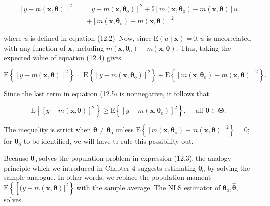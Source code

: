 \documentclass[10pt]{article}
\begin{document}
\begin{align*}
{[y-m(\mathbf{x}, \boldsymbol{\theta})]^{2}=} & {\left[y-m\left(\mathbf{x}, \boldsymbol{\theta}_{\mathrm{o}}\right)\right]^{2}+2\left[m\left(\mathbf{x}, \boldsymbol{\theta}_{\mathrm{o}}\right)-m(\mathbf{x}, \boldsymbol{\theta})\right] u } \\
& +\left[m\left(\mathbf{x}, \boldsymbol{\theta}_{\mathrm{o}}\right)-m(\mathbf{x}, \boldsymbol{\theta})\right]^{2} \tag{12.4}
\end{align*}


where $u$ is defined in equation (12.2). Now, since $\mathrm{E}(u \mid \mathbf{x})=0, u$ is uncorrelated with any function of $\mathbf{x}$, including $m\left(\mathbf{x}, \boldsymbol{\theta}_{\mathrm{o}}\right)-m(\mathbf{x}, \boldsymbol{\theta})$. Thus, taking the expected value of equation (12.4) gives


\begin{equation*}
\mathrm{E}\left\{[y-m(\mathbf{x}, \boldsymbol{\theta})]^{2}\right\}=\mathrm{E}\left\{\left[y-m\left(\mathbf{x}, \boldsymbol{\theta}_{\mathrm{o}}\right)\right]^{2}\right\}+\mathrm{E}\left\{\left[m\left(\mathbf{x}, \boldsymbol{\theta}_{\mathrm{o}}\right)-m(\mathbf{x}, \boldsymbol{\theta})\right]^{2}\right\} . \tag{12.5}
\end{equation*}


Since the last term in equation (12.5) is nonnegative, it follows that


\begin{equation*}
\mathrm{E}\left\{[y-m(\mathbf{x}, \boldsymbol{\theta})]^{2}\right\} \geq \mathrm{E}\left\{\left[y-m\left(\mathbf{x}, \boldsymbol{\theta}_{\mathrm{o}}\right)\right]^{2}\right\}, \quad \text { all } \boldsymbol{\theta} \in \boldsymbol{\Theta} . \tag{12.6}
\end{equation*}


The inequality is strict when $\boldsymbol{\theta} \neq \boldsymbol{\theta}_{\mathrm{o}}$ unless $\mathrm{E}\left\{\left[m\left(\mathbf{x}, \boldsymbol{\theta}_{\mathrm{o}}\right)-m(\mathbf{x}, \boldsymbol{\theta})\right]^{2}\right\}=0$; for $\boldsymbol{\theta}_{\mathrm{o}}$ to be identified, we will have to rule this possibility out.

Because $\boldsymbol{\theta}_{\mathrm{o}}$ solves the population problem in expression (12.3), the analogy principle-which we introduced in Chapter 4-suggests estimating $\boldsymbol{\theta}_{\mathrm{o}}$ by solving the sample analogue. In other words, we replace the population moment $\mathrm{E}\left\{\left[(y-m(\mathbf{x}, \boldsymbol{\theta})]^{2}\right\}\right.$ with the sample average. The NLS estimator of $\boldsymbol{\theta}_{\mathrm{o}}, \hat{\boldsymbol{\theta}}$, solves
\end{document}

